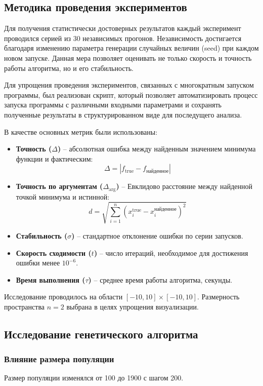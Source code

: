 \documentclass[12pt,a4paper]{article}
\begin{document}
\subsection{Методика проведения экспериментов}
Для получения статистически достоверных результатов каждый эксперимент проводился серией из 30 независимых прогонов.
Независимость достигается благодаря изменению параметра генерации случайных величин (seed) при каждом новом запуске.
Данная мера позволяет оценивать не только скорость и точность работы алгоритма, но и его стабильность.

Для упрощения проведения экспериментов, связанных с многократным запуском программы, был реализован скрипт, который
позволяет автоматизировать процесс запуска программы с различными входными параметрами и сохранять полученные
результаты в структурированном виде для последущего анализа.

В качестве основных метрик были использованы:
\begin{itemize}
    \item \textbf{Точность (\(\Delta\))} -- абсолютная ошибка между найденным значением минимума функции и фактическим:
    \[
    \Delta = \left| f_{\text{true}} - f_{\text{найденное}} \right|
    \]
    \item \textbf{Точность по аргументам (\(\Delta_{\arg}\))} -- Евклидово расстояние между найденной точкой минимума и истинной:
    \[
    d = \sqrt{\sum_{i=1}^{n} (x_i^{\text{true}} - x_i^{\text{найденное}})^2}
    \]
    \item \textbf{Стабильность (\(\sigma\))} -- стандартное отклонение ошибки по серии запусков.
    \item \textbf{Скорость сходимости (\(t\))} -- число итераций, необходимое для достижения ошибки менее \(10^{-6}\).
    \item \textbf{Время выполнения (\(\tau\))} -- среднее время работы алгоритма, секунды.
\end{itemize}

Исследование проводилось на области \([-10, 10] \times [-10, 10]\). Размерность пространства \(n = 2\) выбрана в целях упрощения визуализации.

\subsection{Исследование генетического алгоритма}

\subsubsection{Влияние размера популяции}
Размер популяции изменялся от 100 до 1900 с шагом 200.
\end{document}
